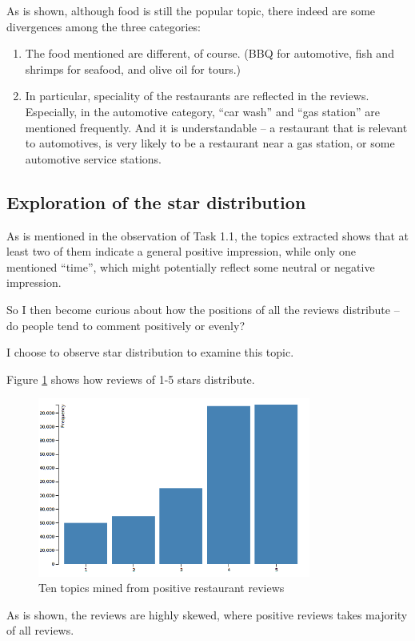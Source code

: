 \documentclass[11pt]{article}
\begin{document}
As is shown, although food is still the popular topic, there indeed are some divergences among the three categories:
\begin{enumerate}
  \item The food mentioned are different, of course. (BBQ for automotive, fish and shrimps for seafood, and olive oil for tours.)
  \item In particular, speciality of the restaurants are reflected in the reviews. Especially, in the automotive category, ``car wash'' and ``gas station'' are mentioned frequently. And it is understandable -- a restaurant that is relevant to automotives, is very likely to be a restaurant near a gas station, or some automotive service stations.
\end{enumerate}

\subsection{Exploration of the star distribution}
As is mentioned in the observation of Task 1.1, the topics extracted shows that at least two of them indicate a general positive impression, while only one mentioned ``time'', which might potentially reflect some neutral or negative impression.

So I then become curious about how the positions of all the reviews distribute -- do people tend to comment positively or evenly?

I choose to observe star distribution to examine this topic.

Figure \ref{fig:star_dist} shows how reviews of 1-5 stars distribute.

\begin{figure}[htp!]
  \centering
  \includegraphics[width=0.8\textwidth]{./img/star_dist.png}
  \caption{Ten topics mined from positive restaurant reviews}
  \label{fig:star_dist}
\end{figure}

As is shown, the reviews are highly skewed, where positive reviews takes majority of all reviews.
\end{document}
